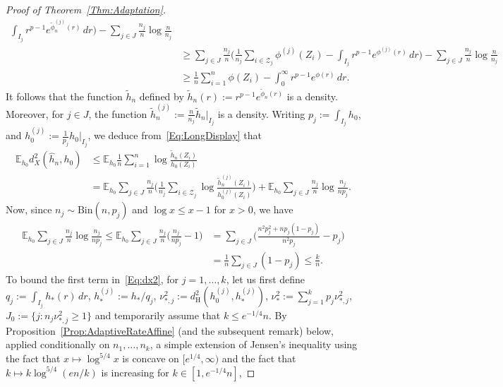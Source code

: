 \documentclass[a4paper,12pt]{article}
\begin{document}
\begin{proof}[Proof of Theorem~\ref{Thm:Adaptation}]
\begin{align}
    \int_{I_j} r^{p-1} e^{\tilde{\phi}_n^{(j)}(r)} \, dr \biggr) - \sum_{j \in J} \frac{n_j}{n} \log \frac{n}{n_j} \nonumber \\
  &\geq \sum_{j \in J} \frac{n_j}{n}
    \biggl(  \frac{1}{n_j} \sum_{i \in \mathcal{Z}_j} \phi^{(j)}(Z_i) -
    \int_{I_j} r^{p-1} e^{\phi^{(j)}(r)} \, dr \biggr) - \sum_{j \in J} \frac{n_j}{n} \log \frac{n}{n_j} \nonumber \\
  &\geq  \frac{1}{n} \sum_{i=1}^n \phi(Z_i) - \int_0^\infty r^{p-1} e^{\phi(r)} \, dr. 
  \end{align}
It follows that the function $\tilde{h}_n$ defined by $\tilde{h}_n(r) := r^{p-1}e^{\tilde{\phi}_n(r)}$ is a density.  Moreover, for $j \in J$, the function $\tilde{h}_n^{(j)} := \frac{n}{n_j}\tilde{h}_n|_{I_j}$ is a density.  Writing $p_j := \int_{I_j} h_0$, and $h_0^{(j)} := \frac{1}{p_j}h_0|_{I_j}$, we deduce from~\eqref{Eq:LongDisplay} that 
  \begin{align}
\label{Eq:dx2}
    \mathbb{E}_{h_0} d_X^2(\hat{h}_n,h_0)
    &\leq \mathbb{E}_{h_0} \frac{1}{n} \sum_{i=1}^n \log \frac{\tilde{h}_n(Z_i)}{h_0(Z_i)} \nonumber \\
       &= \mathbb{E}_{h_0} \sum_{j \in J} \frac{n_j}{n}
      \biggl( \frac{1}{n_j} \sum_{i \in \mathcal{Z}_j} \log \frac{\tilde{h}_n^{(j)}(Z_i) }{h_0^{(j)}(Z_i)} \biggr) + \mathbb{E}_{h_0} \sum_{j \in J} \frac{n_j}{n} \log \frac{n_j}{n p_j}.
  \end{align}
Now, since $n_j \sim \mathrm{Bin}(n,p_j)$ and $\log x \leq x-1$ for $x > 0$, we have
  \begin{align}
\label{Eq:SecondTerm}
    \mathbb{E}_{h_0} \sum_{j \in J}  \frac{n_j}{n} \log \frac{n_j}{n p_j} \leq \mathbb{E}_{h_0} \sum_{j \in J} \frac{n_j}{n} \biggl( \frac{n_j}{np_j} - 1 \biggr) &= \sum_{j \in J} \biggl( \frac{n^2 p_j^2 + np_j(1-p_j)}{n^2 p_j} - p_j \biggr) \nonumber \\
    &= \frac{1}{n}\sum_{j \in J} (1-p_j) \leq \frac{k}{n}.
  \end{align}
To bound the first term in~\eqref{Eq:dx2}, for $j=1,\ldots,k$, let us first define $q_j := \int_{I_j} h_*(r) \, dr$, $h_*^{(j)} := h_*/q_j$, $\nu^2_{*,j} := d_{\mathrm{H}}^2(h_0^{(j)}, h_*^{(j)})$, $\nu^2_* := \sum_{j=1}^k p_j \nu^2_{*,j}$, $J_0 := \{j:n_j\nu_{*,j}^2 \geq 1\}$ and temporarily assume that $k \leq e^{-1/4}n$.  By Proposition~\ref{Prop:AdaptiveRateAffine} (and the subsequent remark) below, applied conditionally on $n_1,\ldots,n_k$, a simple extension of Jensen's inequality using the fact that $x \mapsto \log^{5/4} x$ is concave on $[e^{1/4},\infty)$ \citep[e.g.][Lemma~2]{han2017isotonic} and the fact that $k \mapsto k \log^{5/4}(en/k)$ is increasing for $k \in [1,e^{-1/4}n]$,

\end{proof}
\end{document}

